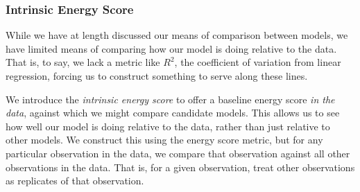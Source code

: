 \subsubsection{Intrinsic Energy Score}
While we have at length discussed our means of comparison between models, we have limited means of
  comparing how our model is doing relative to the data.  That is, to say, we lack a metric like $R^2$,
  the coefficient of variation from linear regression, forcing us to construct something to serve
  along these lines.

We introduce the \emph{intrinsic energy score} to offer a baseline energy score \emph{in the data},
  against which we might compare candidate models.  This allows us to see how well our model is doing
  relative to the data, rather than just relative to other models.  We construct this using the
  energy score metric, but for any particular observation in the data, we compare that observation
  against all other observations in the data.  That is, for a given observation, treat other
  observations as replicates of that observation.



